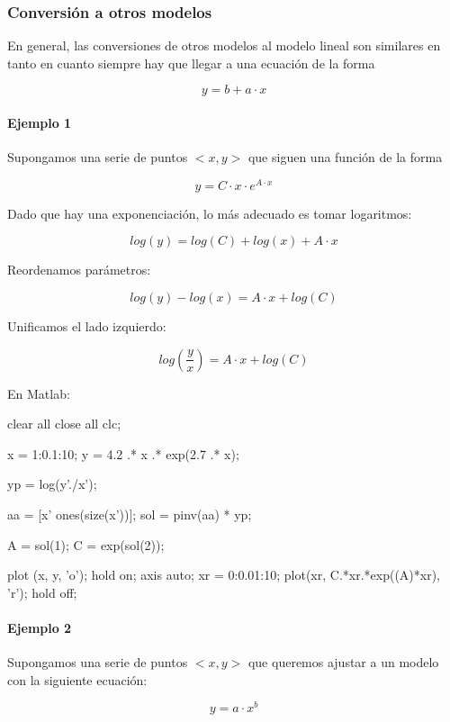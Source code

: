 \documentclass[11pt]{scrartcl}
\begin{document}
\subsubsection{Conversión a otros modelos}

En general, las conversiones de otros modelos al modelo lineal son similares en
tanto en cuanto siempre hay que llegar a una ecuación de la forma

\[
y = b + a \cdot x
\]

\paragraph{Ejemplo 1}

Supongamos una serie de puntos $<x, y>$ que siguen una función de la forma 

\[
y = C \cdot x \cdot e^{A \cdot x}
\]

Dado que hay una exponenciación, lo más adecuado es tomar logaritmos:

\[
log(y) = log(C) + log(x) + A \cdot x
\]

Reordenamos parámetros:

\[
log (y)  - log (x) = A \cdot x + log (C)
\]

Unificamos el lado izquierdo:

\[
log(\frac{y}{x}) = A \cdot x + log(C)
\]

En Matlab:

\begin{matlabcode}
clear all
close all
clc;

x = 1:0.1:10;
y = 4.2 .* x .* exp(2.7 .* x);

yp = log(y'./x');

aa = [x' ones(size(x'))];
sol = pinv(aa) * yp;

A = sol(1); 
C = exp(sol(2));

plot (x, y, 'o'); hold on; axis auto;
xr = 0:0.01:10;
plot(xr, C.*xr.*exp((A)*xr), 'r'); hold off;  
\end{matlabcode}

\paragraph{Ejemplo 2}

Supongamos una serie de puntos $<x, y>$ que queremos ajustar a un modelo con la
siguiente ecuación:

\[
y = a \cdot x^b
\]
\end{document}
